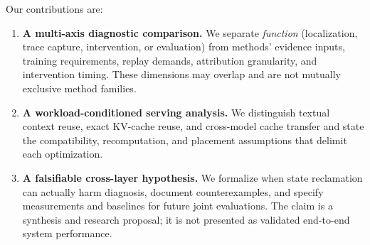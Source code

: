 

Our contributions are:
\begin{enumerate}
\item \textbf{A multi-axis diagnostic comparison.} We separate \emph{function} (localization, trace capture, intervention, or evaluation) from methods' evidence inputs, training requirements, replay demands, attribution granularity, and intervention timing. These dimensions may overlap and are not mutually exclusive method families.
\item \textbf{A workload-conditioned serving analysis.} We distinguish textual context reuse, exact KV-cache reuse, and cross-model cache transfer and state the compatibility, recomputation, and placement assumptions that delimit each optimization.
\item \textbf{A falsifiable cross-layer hypothesis.} We formalize when state reclamation can actually harm diagnosis, document counterexamples, and specify measurements and baselines for future joint evaluations. The claim is a synthesis and research proposal; it is not presented as validated end-to-end system performance.
\end{enumerate}
